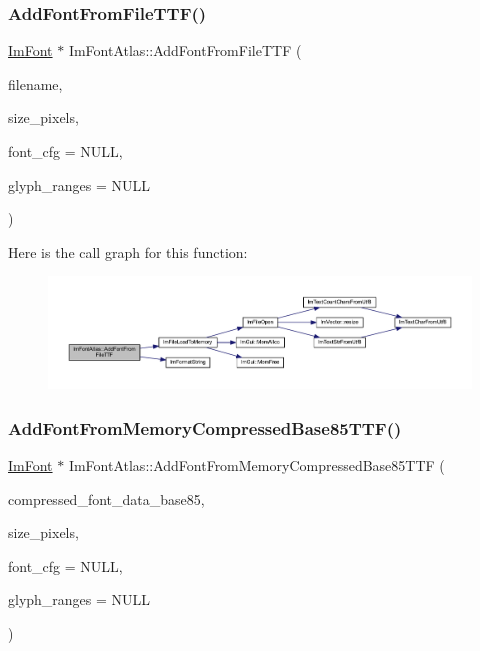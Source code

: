\subsubsection{\texorpdfstring{Add\+Font\+From\+File\+T\+T\+F()}{AddFontFromFileTTF()}}
{\footnotesize\ttfamily \mbox{\hyperlink{struct_im_font}{Im\+Font}} $\ast$ Im\+Font\+Atlas\+::\+Add\+Font\+From\+File\+T\+TF (\begin{DoxyParamCaption}\item[{const char $\ast$}]{filename,  }\item[{float}]{size\+\_\+pixels,  }\item[{const \mbox{\hyperlink{struct_im_font_config}{Im\+Font\+Config}} $\ast$}]{font\+\_\+cfg = {\ttfamily NULL},  }\item[{const \mbox{\hyperlink{imgui_8h_af2c7badaf05a0008e15ef76d40875e97}{Im\+Wchar}} $\ast$}]{glyph\+\_\+ranges = {\ttfamily NULL} }\end{DoxyParamCaption})}

Here is the call graph for this function\+:
\nopagebreak
\begin{figure}[H]
\begin{center}
\leavevmode
\includegraphics[width=350pt]{struct_im_font_atlas_a26d0333bae95222ca2c2fd2886eae562_cgraph}
\end{center}
\end{figure}
\mbox{\label{struct_im_font_atlas_ab43b930beb57c0b998f42f4586677956}} 
\subsubsection{\texorpdfstring{Add\+Font\+From\+Memory\+Compressed\+Base85\+T\+T\+F()}{AddFontFromMemoryCompressedBase85TTF()}}
{\footnotesize\ttfamily \mbox{\hyperlink{struct_im_font}{Im\+Font}} $\ast$ Im\+Font\+Atlas\+::\+Add\+Font\+From\+Memory\+Compressed\+Base85\+T\+TF (\begin{DoxyParamCaption}\item[{const char $\ast$}]{compressed\+\_\+font\+\_\+data\+\_\+base85,  }\item[{float}]{size\+\_\+pixels,  }\item[{const \mbox{\hyperlink{struct_im_font_config}{Im\+Font\+Config}} $\ast$}]{font\+\_\+cfg = {\ttfamily NULL},  }\item[{const \mbox{\hyperlink{imgui_8h_af2c7badaf05a0008e15ef76d40875e97}{Im\+Wchar}} $\ast$}]{glyph\+\_\+ranges = {\ttfamily NULL} }\end{DoxyParamCaption})}

